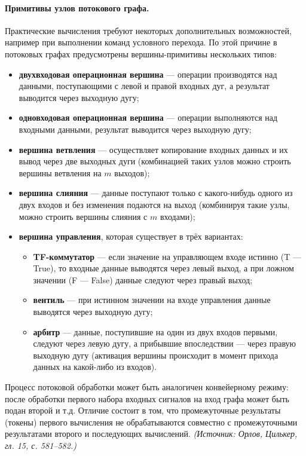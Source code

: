 \documentclass[a4paper,12pt]{article}
\begin{document}
\paragraph{Примитивы узлов потокового графа.}
Практические вычисления требуют некоторых дополнительных возможностей, например при выполнении команд условного перехода. По этой причине в потоковых графах предусмотрены вершины-примитивы нескольких типов:
\begin{itemize}
\item \textbf{двухвходовая операционная вершина} — операции производятся над данными, поступающими с левой и правой входных дуг, а результат выводится через выходную дугу;
\item \textbf{одновходовая операционная вершина} — операции выполняются над входными данными, результат выводится через выходную дугу;
\item \textbf{вершина ветвления} — осуществляет копирование входных данных и их вывод через две выходных дуги (комбинацией таких узлов можно строить вершины ветвления на \(m\) выходов);
\item \textbf{вершина слияния} — данные поступают только с какого-нибудь одного из двух входов и без изменения подаются на выход (комбинируя такие узлы, можно строить вершины слияния с \(m\) входами);
\item \textbf{вершина управления}, которая существует в трёх вариантах:
  \begin{itemize}
  \item \textbf{TF-коммутатор} — если значение на управляющем входе истинно (T — True), то входные данные выводятся через левый выход, а при ложном значении (F — False) данные следуют через правый выход;
  \item \textbf{вентиль} — при истинном значении на входе управления данные выводятся через выходную дугу;
  \item \textbf{арбитр} — данные, поступившие на один из двух входов первыми, следуют через левую дугу, а прибывшие впоследствии — через правую выходную дугу (активация вершины происходит в момент прихода данных на какой-либо из входов).
  \end{itemize}
\end{itemize}
Процесс потоковой обработки может быть аналогичен конвейерному режиму: после обработки первого набора входных сигналов на вход графа может быть подан второй и т.д. Отличие состоит в том, что промежуточные результаты (токены) первого вычисления не обрабатываются совместно с промежуточными результатами второго и последующих вычислений.
\textit{(Источник: Орлов, Цилькер, гл. 15, с. 581--582.)}
\end{document}
